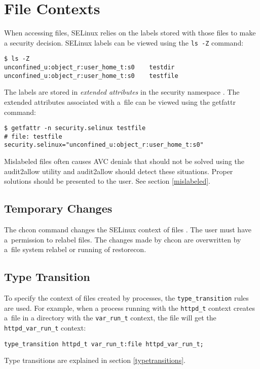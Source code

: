 \section{File Contexts}
\label{filecontexts}
When accessing files, SELinux relies on the labels stored with those files to
make a security decision. SELinux labels can be viewed using the \texttt{ls -Z}
command:
\begin{lstlisting}
$ ls -Z
unconfined_u:object_r:user_home_t:s0    testdir
unconfined_u:object_r:user_home_t:s0    testfile
\end{lstlisting}
The labels are stored in \emph{extended attributes} in the security namespace
\cite{xattrman}. The extended attributes associated with a~file can be viewed
using the getfattr command:
\begin{lstlisting}
$ getfattr -n security.selinux testfile
# file: testfile
security.selinux="unconfined_u:object_r:user_home_t:s0"
\end{lstlisting}
Mislabeled files often causes AVC denials that should not be solved using the
audit2allow utility and audit2allow should detect these situations. Proper
solutions should be presented to the user. See section \ref{mislabeled}.

\subsection{Temporary Changes}
The chcon command changes the SELinux context of files \cite{selinuxguide}. The
user must have a~permission to relabel files. The changes made by chcon are
overwritten by a~file system relabel or running of restorecon.

\subsection{Type Transition}
To specify the context of files created by processes, the
\texttt{type\_transition} rules are used. For example, when a process running
with the \texttt{httpd\_t} context creates a~file in a directory with the
\texttt{var\_run\_t} context, the file will get the
\texttt{httpd\_var\_run\_t} context:
\begin{lstlisting}[language=te]
type_transition httpd_t var_run_t:file httpd_var_run_t;
\end{lstlisting}
Type transitions are explained in section \ref{typetransitions}.

